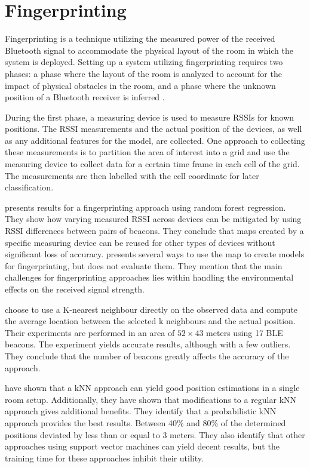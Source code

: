 \section{Fingerprinting}
Fingerprinting is a technique utilizing the measured power of the received Bluetooth signal to accommodate the physical layout of the room in which the system is deployed. 
Setting up a system utilizing fingerprinting requires two phases: a phase where the layout of the room is analyzed to account for the impact of physical obstacles in the room, and a phase where the unknown position of a Bluetooth receiver is inferred \cite{presence_ble_review, taking_localization_to_the_wild}.

During the first phase, a measuring device is used to measure RSSIs for known positions.
The RSSI measurements and the actual position of the devices, as well as any additional features for the model, are collected. 
One approach to collecting these measurements is to partition the area of interest into a grid and use the measuring device to collect data for a certain time frame in each cell of the grid.\cite{improving_indoor_localization}
The measurements are then labelled with the cell coordinate for later classification.

\citeauthor{taking_localization_to_the_wild} \cite{taking_localization_to_the_wild} presents results for a fingerprinting approach using random forest regression.
They show how varying measured RSSI across devices can be mitigated by using RSSI differences between pairs of beacons.
They conclude that maps created by a specific measuring device can be reused for other types of devices without significant loss of accuracy. 
\citeauthor{presence_ble_review}\cite{presence_ble_review} presents several ways to use the map to create models for fingerprinting, but does not evaluate them.
They mention that the main challenges for fingerprinting approaches lies within handling the environmental effects on the received signal strength.

\citeauthor{improving_indoor_localization} \cite{improving_indoor_localization} choose to use a K-nearest neighbour directly on the observed data and compute the average location between the selected k neighbours and the actual position. 
Their experiments are performed in an area of $52\times43$ meters using 17 BLE beacons.
The experiment yields accurate results, although with a few outliers. 
They conclude that the number of beacons greatly affects the accuracy of the approach.

\citeauthor{ble_kneares_neural}\cite{ble_kneares_neural} have shown that a kNN approach can yield good position estimations in a single room setup. 
Additionally, they have shown that modifications to a regular kNN approach gives additional benefits. 
They identify that a probabilistic kNN approach provides the best results. 
Between 40\% and 80\% of the determined positions deviated by less than or equal to 3 meters. 
They also identify that other approaches using support vector machines can yield decent results, but the training time for these approaches inhibit their utility.